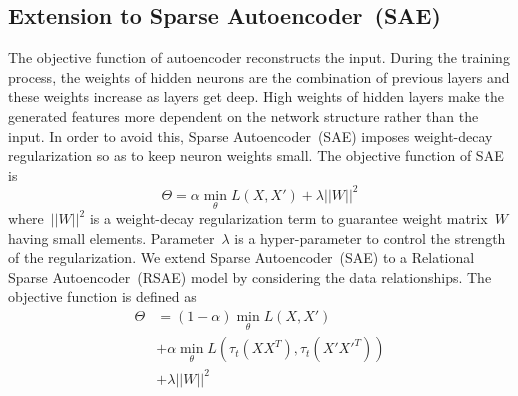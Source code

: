 \documentclass[conference]{IEEEtran}
\begin{document}
	\subsection{Extension to Sparse Autoencoder~(SAE)}
	The objective function of autoencoder reconstructs the input. During the training process, the weights of hidden neurons are the combination of previous layers and these weights increase as layers get deep. High weights of hidden layers make the generated features more dependent on the network structure rather than the input. In order to avoid this, Sparse Autoencoder~(SAE) imposes weight-decay regularization so as to keep neuron weights small. The objective function of SAE is
	\begin{equation}
	\Theta = \alpha\min_{\theta} L(X, X') + \lambda||W||^{2}
	\end{equation}
	where~$||W||^{2}$ is a weight-decay regularization term to guarantee weight matrix~$W$ having small elements. Parameter~$\lambda$ is a hyper-parameter to control the strength of the regularization. We extend Sparse Autoencoder~(SAE) to a Relational Sparse Autoencoder~(RSAE) model by considering the data relationships. The objective function is defined as
	\begin{equation}
	\begin{split}
	\Theta &= (1-\alpha)\min_{\theta} L(X, X') \\
	& + \alpha\min_{\theta}L(\tau_{t}(XX^{T}), \tau_{t}(X'X'^{T})) \\
	& + \lambda||W||^{2}
	\end{split}
	\end{equation}
	
\end{document}
